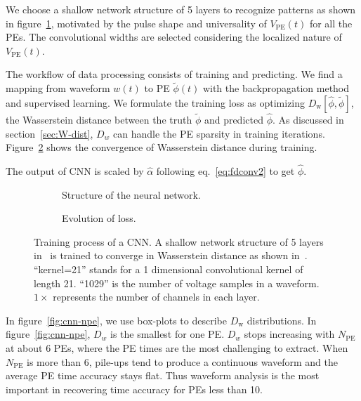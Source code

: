 We choose a shallow network structure of 5 layers to recognize patterns as shown in figure~\ref{fig:struct}, motivated by the pulse shape and universality of $V_\mathrm{PE}(t)$ for all the PEs.  The convolutional widths are selected considering the localized nature of $V_\mathrm{PE}(t)$.

The workflow of data processing consists of training and predicting. We find a mapping from waveform $w(t)$ to PE $\tilde{\phi}(t)$ with the backpropagation method and supervised learning. We formulate the training loss as optimizing $D_\mathrm{w}[\hat{\phi}, \tilde{\phi}] $, the Wasserstein distance between the truth $\tilde{\phi}$ and predicted $\hat{\phi}$. As discussed in section~\ref{sec:W-dist}, $D_w$ can handle the PE sparsity in training iterations. Figure~\ref{fig:loss} shows the convergence of Wasserstein distance during training.

The output of CNN is scaled by $\hat{\alpha}$ following eq.~\eqref{eq:fdconv2} to get $\hat{\phi}$.

\begin{figure}[H]
  \begin{subfigure}{.4\textwidth}
    \centering
    \begin{adjustbox}{width=0.5\textwidth}
      
    \end{adjustbox}
    \caption{\label{fig:struct} Structure of the neural network.}
  \end{subfigure}
  \begin{subfigure}{.5\textwidth}
    \centering
    \resizebox{\textwidth}{!}{}
    \caption{\label{fig:loss} Evolution of loss.}
  \end{subfigure}
  \caption{\label{fig:CNN} Training process of a CNN. A shallow network structure of 5 layers in~ is trained to converge in Wasserstein distance as shown in~.  ``kernel=21'' stands for a 1 dimensional convolutional kernel of length 21. ``1029'' is the number of voltage samples in a waveform.  $1\times$ represents the number of channels in each layer.}
\end{figure}

\vspace{-0.5cm}
In figure~\ref{fig:cnn-npe}, we use box-plots to describe $D_\mathrm{w}$ distributions. In figure~\ref{fig:cnn-npe}, $D_w$ is the smallest for one PE.  $D_w$ stops increasing with $N_\mathrm{PE}$ at about 6 PEs, where the PE times are the most challenging to extract.  When $N_\mathrm{PE}$ is more than 6, pile-ups tend to produce a continuous waveform and the average PE time accuracy stays flat. Thus waveform analysis is the most important in recovering time accuracy for PEs less than 10.

